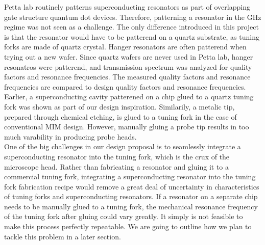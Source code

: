 \documentclass[11pt]{article}
\numberwithin{equation}{section}
\begin{document}
Petta lab routinely patterns superconducting resonators as part of overlapping gate structure quantum dot devices.  Therefore, patterning a resonator in the GHz regime was not seen as a challenge.  The only difference introduced in this project is that the resonator would have to be patterend on a quartz substrate, as tuning forks are made of quartz crystal.  Hanger resonators are often patterend when trying out a new wafer.  Since quartz wafers are never used in Petta lab, hanger resonatros were patterend, and transmission spectrum was analyzed for quality factors and resonance frequencies.  The measured quality factors and resonance frequencies are compared to design quality factors and resonance frequencies. \\

Earlier, a superconducting cavity patterened on a chip glued to a quartz tuning fork was shown as part of our design inspiration.  Similarily, a metalic tip, prepared through chemical etching, is glued to a tuning fork in the case of conventional MIM design. However, manually gluing a probe tip results in too much varability in producing probe heads.  \\

One of the big challenges in our design proposal is to seamlessly integrate a superconducting resonator into the tuning fork, which is the crux of the microscope head.  Rather than fabricating a resonator and gluing it to a commercial tuning fork, integrating a superconducting resonator into the tuning fork fabrication recipe would remove a great deal of uncertainty in characteristics of tuning forks and superconducting resonators.  If a resonator on a separate chip needs to be manually glued to a tuning fork, the mechanical resonance frequency of the tuning fork after gluing could vary greatly.  It simply is not feasible to make this process perfectly repeatable.  We are going to outline how we plan to tackle this problem in a later section.   
\end{document}
